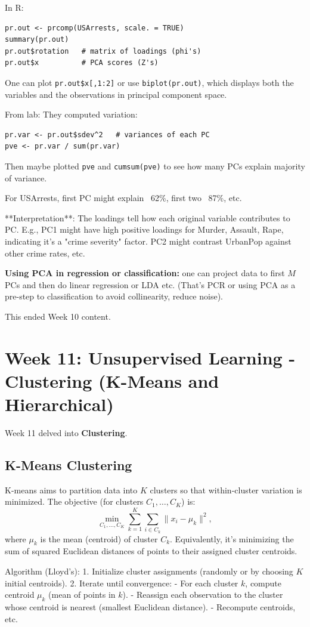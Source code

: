 \documentclass[11pt]{article}
\begin{document}
\noindent In R:
\begin{verbatim}
pr.out <- prcomp(USArrests, scale. = TRUE)
summary(pr.out)
pr.out$rotation   # matrix of loadings (phi's)
pr.out$x          # PCA scores (Z's)
\end{verbatim}
One can plot \texttt{pr.out\$x[,1:2]} or use \texttt{biplot(pr.out)}, which displays both the variables and the observations in principal component space.

From lab:
They computed variation:
\begin{verbatim}
pr.var <- pr.out$sdev^2   # variances of each PC
pve <- pr.var / sum(pr.var)
\end{verbatim}
Then maybe plotted \texttt{pve} and \texttt{cumsum(pve)} to see how many PCs explain majority of variance.

For USArrests, first PC might explain ~62\%, first two ~87\%, etc.

**Interpretation**: The loadings tell how each original variable contributes to PC. E.g., PC1 might have high positive loadings for Murder, Assault, Rape, indicating it's a "crime severity" factor. PC2 might contrast UrbanPop against other crime rates, etc.

\textbf{Using PCA in regression or classification:} one can project data to first $M$ PCs and then do linear regression or LDA etc. (That's PCR or using PCA as a pre-step to classification to avoid collinearity, reduce noise).

This ended Week 10 content.

\section{Week 11: Unsupervised Learning - Clustering (K-Means and Hierarchical)}
Week 11 delved into \textbf{Clustering}.

\subsection{K-Means Clustering}
K-means aims to partition data into $K$ clusters so that within-cluster variation is minimized. The objective (for clusters $C_1, \ldots, C_K$) is:
\[ \min_{C_1,\ldots,C_K} \sum_{k=1}^K \sum_{i \in C_k} \|x_i - \mu_k\|^2, \]
where $\mu_k$ is the mean (centroid) of cluster $C_k$. Equivalently, it's minimizing the sum of squared Euclidean distances of points to their assigned cluster centroids.

Algorithm (Lloyd's):
1. Initialize cluster assignments (randomly or by choosing $K$ initial centroids).
2. Iterate until convergence:
   - For each cluster $k$, compute centroid $\mu_k$ (mean of points in $k$).
   - Reassign each observation to the cluster whose centroid is nearest (smallest Euclidean distance).
   - Recompute centroids, etc.
\end{document}
